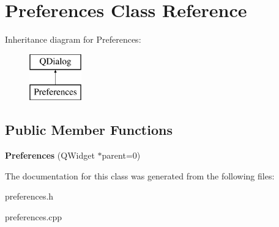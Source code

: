 \hypertarget{classPreferences}{\section{Preferences Class Reference}
\label{classPreferences}
}
Inheritance diagram for Preferences\-:\begin{figure}[H]
\begin{center}
\leavevmode
\includegraphics[height=2.000000cm]{classPreferences}
\end{center}
\end{figure}
\subsection*{Public Member Functions}
\begin{DoxyCompactItemize}
\item 
\hypertarget{classPreferences_a3fc460c1a11115945b78b2d35d7ade00}{{\bfseries Preferences} (Q\-Widget $\ast$parent=0)}\label{classPreferences_a3fc460c1a11115945b78b2d35d7ade00}

\end{DoxyCompactItemize}


The documentation for this class was generated from the following files\-:\begin{DoxyCompactItemize}
\item 
preferences.\-h\item 
preferences.\-cpp\end{DoxyCompactItemize}
